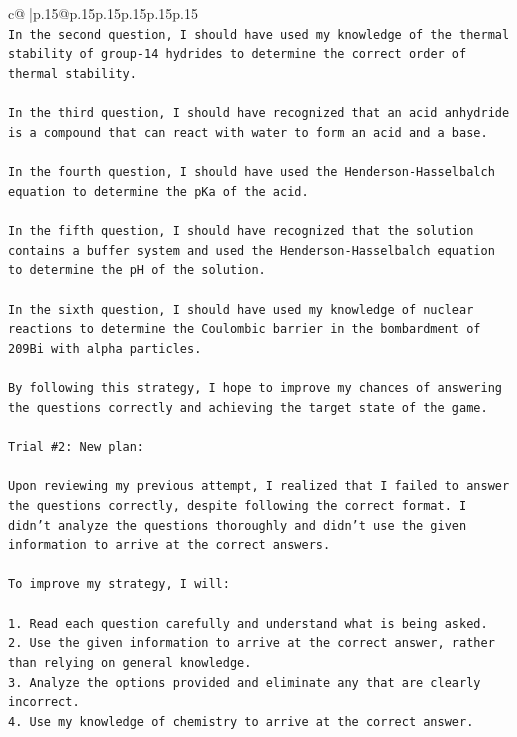 \documentclass{article}
\begin{document}
{\begin{supertabular}{c@{$\;$}|p{.15\linewidth}@{}p{.15\linewidth}p{.15\linewidth}p{.15\linewidth}p{.15\linewidth}p{.15\linewidth}}
{{{\\ 
\texttt{In the second question, I should have used my knowledge of the thermal stability of group{-}14 hydrides to determine the correct order of thermal stability.} \\
\\ 
\texttt{In the third question, I should have recognized that an acid anhydride is a compound that can react with water to form an acid and a base.} \\
\\ 
\texttt{In the fourth question, I should have used the Henderson{-}Hasselbalch equation to determine the pKa of the acid.} \\
\\ 
\texttt{In the fifth question, I should have recognized that the solution contains a buffer system and used the Henderson{-}Hasselbalch equation to determine the pH of the solution.} \\
\\ 
\texttt{In the sixth question, I should have used my knowledge of nuclear reactions to determine the Coulombic barrier in the bombardment of 209Bi with alpha particles.} \\
\\ 
\texttt{By following this strategy, I hope to improve my chances of answering the questions correctly and achieving the target state of the game.} \\
\\ 
\texttt{Trial \#2: New plan: } \\
\\ 
\texttt{Upon reviewing my previous attempt, I realized that I failed to answer the questions correctly, despite following the correct format. I didn't analyze the questions thoroughly and didn't use the given information to arrive at the correct answers. } \\
\\ 
\texttt{To improve my strategy, I will:} \\
\\ 
\texttt{1. Read each question carefully and understand what is being asked.} \\
\texttt{2. Use the given information to arrive at the correct answer, rather than relying on general knowledge.} \\
\texttt{3. Analyze the options provided and eliminate any that are clearly incorrect.} \\
\texttt{4. Use my knowledge of chemistry to arrive at the correct answer.} \\
}}}
\end{supertabular}}
\end{document}
